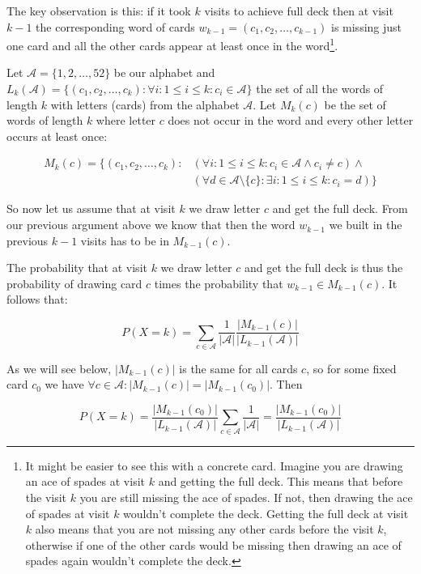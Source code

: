 The key observation is this: if it took $k$ visits to achieve full deck then at visit $k-1$ the corresponding word of cards $w_{k-1}=(c_1, c_2, \ldots, c_{k-1})$ is missing just one card and all the other cards appear at least once in the word\footnote{It might be easier to see this with a concrete card. Imagine you are drawing an ace of spades at visit $k$ and getting the full deck. This means that before the visit $k$ you are still missing the ace of spades. If not, then drawing the ace of spades at visit $k$ wouldn't complete the deck. Getting the full deck at visit $k$ also means that you are not missing any other cards before the visit $k$, otherwise if one of the other cards would be missing then drawing an ace of spades again wouldn't complete the deck.}.

Let $\mathcal{A} = \{1, 2, \ldots, 52\}$ be our alphabet and $L_k(\mathcal{A}) = \{(c_1, c_2, \ldots, c_k): \forall i: 1 \leq i \leq k: c_i \in \mathcal{A}\}$ the set of all the words of length $k$ with letters (cards) from the alphabet $\mathcal{A}$. Let $M_k(c)$ be the set of words of length $k$ where letter $c$ does not occur in the word and every other letter occurs at least once:

\begin{align*}
M_k(c) = \{(c_1, c_2, \ldots, c_k): &(\forall i: 1 \leq i \leq k: c_i \in \mathcal{A} \wedge c_i \neq c) \wedge \\
& (\forall d \in \mathcal{A} \setminus \{c\}: \exists i: 1 \leq i \leq k: c_i = d)\}
\end{align*}

So now let us assume that at visit $k$ we draw letter $c$ and get the full deck. From our previous argument above we know that then the word $w_{k-1}$ we built in the previous $k-1$ visits has to be in $M_{k-1}(c)$.


The probability that at visit $k$ we draw letter $c$ and get the full deck is thus the probability of drawing card $c$ times the probability that $w_{k-1} \in M_{k-1}(c)$. It follows that:

$$
P(X=k) = \sum_{c \in \mathcal{A}} \frac{1}{|\mathcal{A}|} \frac{|M_{k-1}(c)|}{|L_{k-1}(\mathcal{A})|}
$$

As we will see below, $|M_{k-1}(c)|$ is the same for all cards $c$, so for some fixed card $c_0$ we have $\forall c \in \mathcal{A}: |M_{k-1}(c)| = |M_{k-1}(c_0)|$. Then

$$
P(X=k) = \frac{|M_{k-1}(c_0)|}{|L_{k-1}(\mathcal{A})|} \sum_{c \in \mathcal{A}} \frac{1}{|\mathcal{A}|} = \frac{|M_{k-1}(c_0)|}{|L_{k-1}(\mathcal{A})|}
$$


